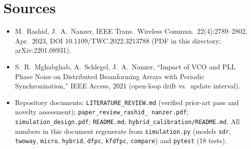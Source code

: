 \documentclass[10pt]{article}
\newcommand{\code}[1]{\texttt{#1}}
\begin{document}
\section*{Sources}
\begin{itemize}
\item M.~Rashid, J.~A.~Nanzer, IEEE Trans.\ Wireless Commun.\
22(4):2789--2802, Apr.\ 2023, DOI 10.1109/TWC.2022.3213788 (PDF in this
directory; arXiv:2201.08931).
\item S.~R.~Mghabghab, A.~Schlegel, J.~A.~Nanzer, ``Impact of VCO and PLL
Phase Noise on Distributed Beamforming Arrays with Periodic
Synchronization,'' IEEE Access, 2021 (open-loop drift vs.\ update
interval).
\item Repository documents: \code{LITERATURE\_REVIEW.md} (verified
prior-art pass and novelty assessment); \code{paper\_review\_rashid\_%
nanzer.pdf}; \code{simulation\_design.pdf}; \code{README.md};
\code{hybrid\_calibration/README.md}. All numbers in this document
regenerate from \code{simulation.py} (models \code{sdr}, \code{twoway},
\code{micro}, \code{hybrid}, \code{dfpc}, \code{kfdfpc},
\code{compare}) and \code{pytest} (18 tests).
\end{itemize}
\end{document}
